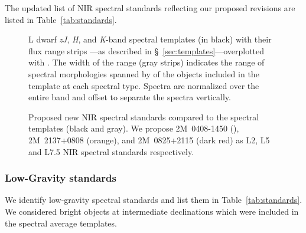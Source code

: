 \documentclass[modern,trackchanges]{aastex61}
\begin{document}
The updated list of NIR spectral standards reflecting our proposed revisions are listed in Table~\ref{tab:standards}.

\begin{figure}[hb!]
        \caption{L dwarf \emph{zJ}, \emph{H}, and \emph{K}-band spectral templates (in black) with their flux range strips ---as described in \S~\ref{sec:templates}---overplotted with .
    The width of the range (gray strips) indicates the range of spectral morphologies spanned
    by of the objects included in the template at each spectral type.
    Spectra are normalized over the entire band and offset to separate the spectra vertically.}
    \label{fig:templates-stds}
\end{figure}


\begin{figure}
        \caption{Proposed new NIR spectral standards compared to the spectral templates (black and gray).
        We propose 2M~0408-1450 (), 2M~2137+0808 (orange), and 2M~0825+2115 (dark red) as L2, L5 and L7.5 NIR spectral standards respectively.}
    \label{fig:templates-newstds}
\end{figure}
\clearpage

\subsubsection{Low-Gravity standards}

We identify low-gravity spectral standards and list them in Table~\ref{tab:standards}.
We considered bright objects at intermediate declinations which were included in the spectral average templates.
\end{document}
